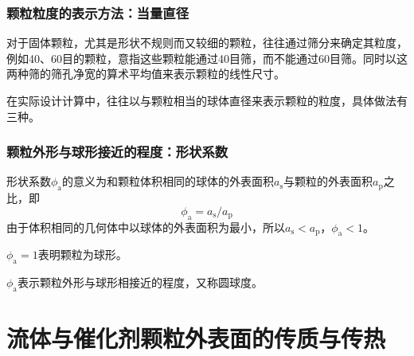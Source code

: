 \documentclass[dvipsnames, svgnames, x11names]{beamer}
\begin{document}
\begin{frame}
    \frametitle{颗粒粒度的表示方法：当量直径}

    对于固体颗粒，尤其是形状不规则而又较细的颗粒，往往通过筛分来确定其粒度，例如40、60目的颗粒，意指这些颗粒能通过40目筛，而不能通过60目筛。同时以这两种筛的筛孔净宽的算术平均值来表示颗粒的线性尺寸。
    
    \bigskip

    在实际设计计算中，往往以与颗粒相当的球体直径来表示颗粒的粒度，具体做法有三种。
    

\end{frame}


\begin{frame}
    \frametitle{颗粒外形与球形接近的程度：形状系数}

    形状系数$\phi_\mathrm{a}$的意义为和颗粒体积相同的球体的外表面积$a_\mathrm{s}$与颗粒的外表面积$a_\mathrm{p}$之比，即
    \[
        \phi_\mathrm{a} = a_\mathrm{s} / a_\mathrm{p}
    \]
    由于体积相同的几何体中以球体的外表面积为最小，所以$a_\mathrm{s} < a_\mathrm{p}$，$\phi_\mathrm{a} < 1$。
    
    $\phi_\mathrm{a} = 1$表明颗粒为球形。
    
    $\phi_\mathrm{a}$表示颗粒外形与球形相接近的程度，又称圆球度。

\end{frame}


\section{流体与催化剂颗粒外表面的传质与传热}
\end{document}
